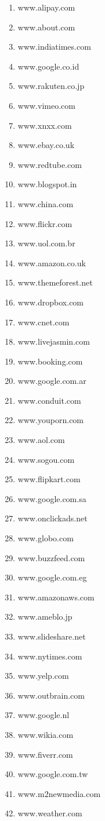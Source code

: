 \begin{enumerate}
\item www.alipay.com
\item www.about.com
\item www.indiatimes.com
\item www.google.co.id
\item www.rakuten.co.jp
\item www.vimeo.com
\item www.xnxx.com
\item www.ebay.co.uk
\item www.redtube.com
\item www.blogspot.in
\item www.china.com
\item www.flickr.com
\item www.uol.com.br
\item www.amazon.co.uk
\item www.themeforest.net
\item www.dropbox.com
\item www.cnet.com
\item www.livejasmin.com
\item www.booking.com
\item www.google.com.ar
\item www.conduit.com
\item www.youporn.com
\item www.aol.com
\item www.sogou.com
\item www.flipkart.com
\item www.google.com.sa
\item www.onclickads.net
\item www.globo.com
\item www.buzzfeed.com
\item www.google.com.eg
\item www.amazonaws.com
\item www.ameblo.jp
\item www.slideshare.net
\item www.nytimes.com
\item www.yelp.com
\item www.outbrain.com
\item www.google.nl
\item www.wikia.com
\item www.fiverr.com
\item www.google.com.tw
\item www.m2newmedia.com
\item www.weather.com

\end{enumerate}
